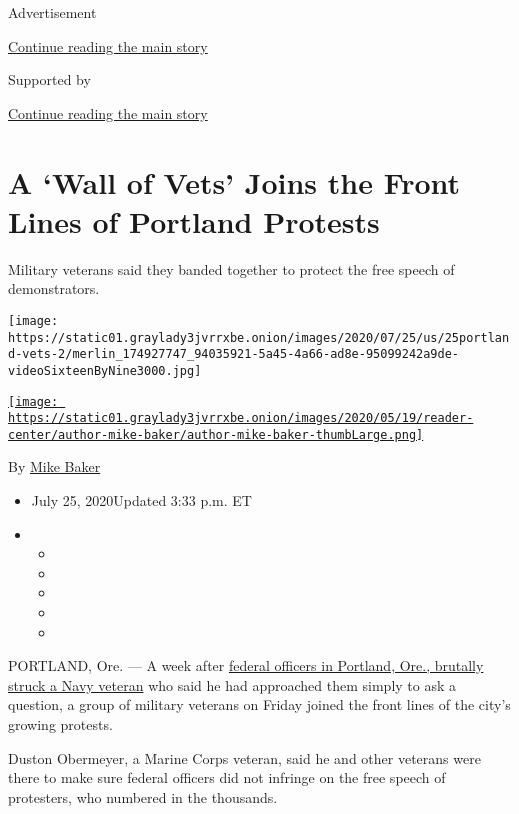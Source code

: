Advertisement

\protect\hyperlink{after-top}{Continue reading the main story}

Supported by

\protect\hyperlink{after-sponsor}{Continue reading the main story}

\hypertarget{a-wall-of-vets-joins-the-front-lines-of-portland-protests}{%
\section{A `Wall of Vets' Joins the Front Lines of Portland
Protests}\label{a-wall-of-vets-joins-the-front-lines-of-portland-protests}}

Military veterans said they banded together to protect the free speech
of demonstrators.

\texttt{[image: https://static01.graylady3jvrrxbe.onion/images/2020/07/25/us/25portland-vets-2/merlin\_174927747\_94035921-5a45-4a66-ad8e-95099242a9de-videoSixteenByNine3000.jpg]}

\href{https://www.nytimes3xbfgragh.onion/by/mike-baker}{\texttt{[image: https://static01.graylady3jvrrxbe.onion/images/2020/05/19/reader-center/author-mike-baker/author-mike-baker-thumbLarge.png]}}

By \href{https://www.nytimes3xbfgragh.onion/by/mike-baker}{Mike Baker}

\begin{itemize}
\item
  July 25, 2020Updated 3:33 p.m. ET
\item
  \begin{itemize}
  \item
  \item
  \item
  \item
  \item
  \end{itemize}
\end{itemize}

PORTLAND, Ore. --- A week after
\href{https://www.nytimes3xbfgragh.onion/2020/07/20/us/portland-protests-navy-christopher-david.html}{federal
officers in Portland, Ore., brutally struck a Navy veteran} who said he
had approached them simply to ask a question, a group of military
veterans on Friday joined the front lines of the city's growing
protests.

Duston Obermeyer, a Marine Corps veteran, said he and other veterans
were there to make sure federal officers did not infringe on the free
speech of protesters, who numbered in the thousands.

